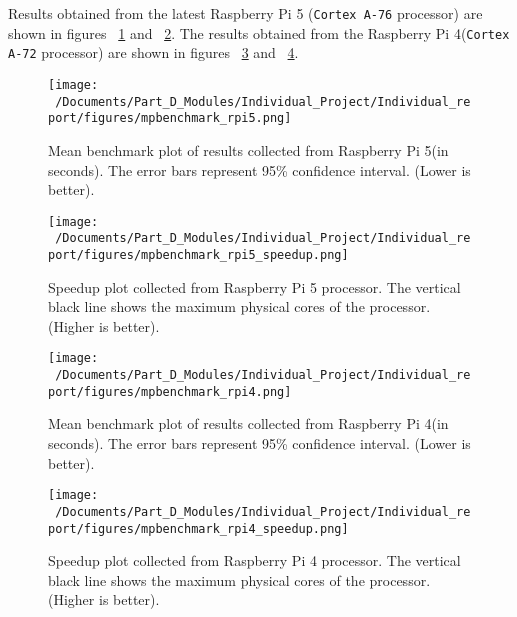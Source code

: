 
Results obtained from the latest Raspberry Pi 5 (\texttt{Cortex A-76} processor) are shown in figures ~\ref{fig:mpbenchmark_rpi5_plot} and ~\ref{fig:mpbenchmark_rpi5_speedup_plot}. The results obtained from the Raspberry Pi 4(\texttt{Cortex A-72} processor) are shown in figures ~\ref{fig:mpbenchmark_rpi4_plot} and ~\ref{fig:mpbenchmark_rpi4_speedup_plot}.

\begin{figure}[htbp] %
	\centering
	\texttt{[image: ~/Documents/Part\_D\_Modules/Individual\_Project/Individual\_report/figures/mpbenchmark\_rpi5.png]} %
	\caption{Mean benchmark plot of results collected from Raspberry Pi 5(in seconds). The error bars represent 95\% confidence interval. (Lower is better).}
	\label{fig:mpbenchmark_rpi5_plot} %
\end{figure}

\begin{figure}[htbp] %
	\centering
	\texttt{[image: ~/Documents/Part\_D\_Modules/Individual\_Project/Individual\_report/figures/mpbenchmark\_rpi5\_speedup.png]} %
	\caption{Speedup plot collected from Raspberry Pi 5 processor. The vertical black line shows the maximum physical cores of the processor. (Higher is better).}
	\label{fig:mpbenchmark_rpi5_speedup_plot} %
\end{figure}

\begin{figure}[htbp] %
	\centering
	\texttt{[image: ~/Documents/Part\_D\_Modules/Individual\_Project/Individual\_report/figures/mpbenchmark\_rpi4.png]} %
	\caption{Mean benchmark plot of results collected from Raspberry Pi 4(in seconds). The error bars represent 95\% confidence interval. (Lower is better).}
	\label{fig:mpbenchmark_rpi4_plot} %
\end{figure}

\begin{figure}[htbp] %
	\centering
	\texttt{[image: ~/Documents/Part\_D\_Modules/Individual\_Project/Individual\_report/figures/mpbenchmark\_rpi4\_speedup.png]} %
	\caption{Speedup plot collected from Raspberry Pi 4 processor. The vertical black line shows the maximum physical cores of the processor. (Higher is better).}
	\label{fig:mpbenchmark_rpi4_speedup_plot} %
\end{figure}

